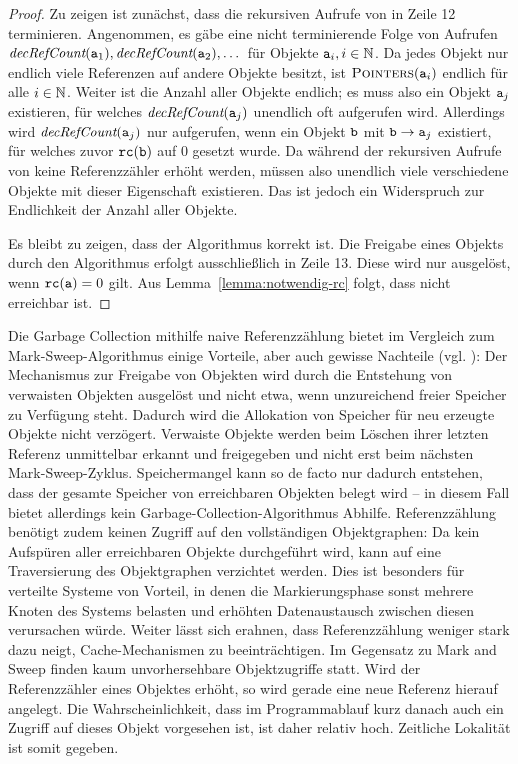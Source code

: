 \begin{proof}
	Zu zeigen ist zunächst, dass die rekursiven Aufrufe von  in Zeile 12 terminieren.
	Angenommen, es gäbe eine nicht terminierende Folge von Aufrufen $\textit{decRefCount}(\texttt{a}_1), \textit{decRefCount}(\texttt{a}_2), \dots$
	für Objekte $\texttt{a}_i, i \in \mathbb{N}$.
	Da jedes Objekt nur endlich viele Referenzen auf andere Objekte besitzt, ist $\textsc{Pointers}(\texttt{a}_i)$ endlich für alle $i \in \mathbb{N}$.
	Weiter ist die Anzahl aller Objekte endlich; es muss also ein Objekt $\texttt{a}_j$ existieren, für welches $\textit{decRefCount}(\texttt{a}_j)$ unendlich oft aufgerufen wird.
	Allerdings wird $\textit{decRefCount}(\texttt{a}_j)$ nur aufgerufen, wenn ein Objekt $\texttt{b}$ mit $\texttt{b} \rightarrow \texttt{a}_j$ existiert, für welches zuvor $\texttt{rc}(\texttt{b})$ auf $0$ gesetzt wurde.
	Da während der rekursiven Aufrufe von  keine Referenzzähler erhöht werden, müssen also unendlich viele verschiedene Objekte  mit dieser Eigenschaft existieren.
	Das ist jedoch ein Widerspruch zur Endlichkeit der Anzahl aller Objekte.
	
	Es bleibt zu zeigen, dass der Algorithmus korrekt ist.
	Die Freigabe eines Objekts  durch den Algorithmus erfolgt ausschließlich in Zeile 13.
	Diese wird nur ausgelöst, wenn $\texttt{rc}(\texttt{a}) = 0$ gilt.
	Aus Lemma~\ref{lemma:notwendig-rc} folgt, dass  nicht erreichbar ist.
\end{proof}

Die Garbage Collection mithilfe naive Referenzzählung bietet im Vergleich zum Mark-Sweep-Algorithmus einige Vorteile, aber auch gewisse Nachteile (vgl. \cite[S. 346]{linhou2006}):
Der Mechanismus zur Freigabe von Objekten wird durch die Entstehung von verwaisten Objekten ausgelöst und nicht etwa, wenn unzureichend freier Speicher zu Verfügung steht.
Dadurch wird die Allokation von Speicher für neu erzeugte Objekte nicht verzögert.
Verwaiste Objekte werden beim Löschen ihrer letzten Referenz unmittelbar erkannt und freigegeben und nicht erst beim nächsten Mark-Sweep-Zyklus.
Speichermangel kann so de facto nur dadurch entstehen, dass der gesamte Speicher von erreichbaren Objekten belegt wird -- in diesem Fall bietet allerdings kein Garbage-Collection-Algorithmus Abhilfe.
Referenzzählung benötigt zudem keinen Zugriff auf den vollständigen Objektgraphen:
Da kein Aufspüren aller erreichbaren Objekte durchgeführt wird, kann auf eine Traversierung des Objektgraphen verzichtet werden.
Dies ist besonders für verteilte Systeme von Vorteil, in denen die Markierungsphase sonst mehrere Knoten des Systems belasten und erhöhten Datenaustausch zwischen diesen verursachen würde.
Weiter lässt sich erahnen, dass Referenzzählung weniger stark dazu neigt, Cache-Mechanismen zu beeinträchtigen.
Im Gegensatz zu Mark and Sweep finden kaum unvorhersehbare Objektzugriffe statt.
Wird der Referenzzähler eines Objektes erhöht, so wird gerade eine neue Referenz hierauf angelegt.
Die Wahrscheinlichkeit, dass im Programmablauf kurz danach auch ein Zugriff auf dieses Objekt vorgesehen ist, ist daher relativ hoch.
Zeitliche Lokalität ist somit gegeben.

